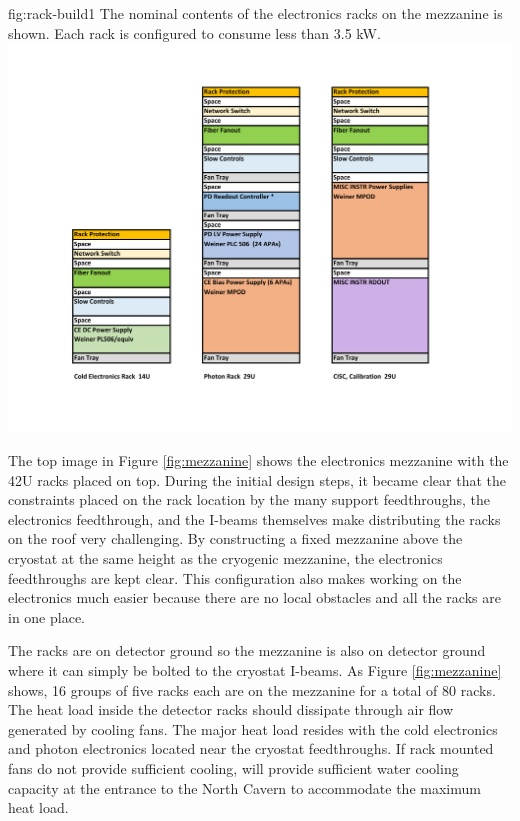 \begin{dunefigure}{fig:rack-build1}
  {The nominal contents of the electronics racks on the mezzanine is shown. Each rack is configured to consume less than 3.5 \si{kW}. }
 \includegraphics[width=.98\textwidth]{graphics/rack-build1.pdf}
\end{dunefigure}

The top image in Figure \ref{fig:mezzanine} shows the  electronics mezzanine with the 42U racks placed on top. 
During the initial design steps, it became clear that the constraints placed on the rack location by the many  support feedthroughs, the electronics feedthrough, and the I-beams themselves make distributing the racks on the roof very challenging. 
By constructing a fixed mezzanine above the cryostat at the same height as the cryogenic mezzanine, the electronics feedthroughs are kept clear. 
This configuration also makes working on the electronics much easier because there are no local obstacles and all the racks are in one place.

The racks are on detector ground so the mezzanine is also on detector ground where it can simply be bolted to the cryostat I-beams. 
As Figure \ref{fig:mezzanine} shows, 16 groups of five racks each are on the mezzanine for a total of 80 racks. 
The heat load inside the detector racks should dissipate through air flow generated by cooling fans.  The major heat load resides with the cold electronics and photon electronics located near the cryostat feedthroughs.  If rack mounted fans do not provide sufficient cooling,   will provide sufficient water cooling capacity at the entrance to the North Cavern to accommodate the maximum heat load. 

